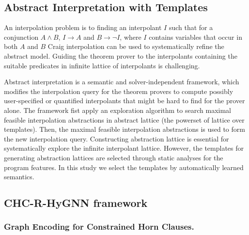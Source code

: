 \subsection{Abstract Interpretation with Templates}

An interpolation problem is to finding an interpolant $I$ such that for a conjunction $A\wedge B$, $I\rightarrow A$ and $B\rightarrow \neg I$, where $I$ contains variables that occur in both $A$ and $B$
%
Craig interpolation can be used to systematically
refine the abstract model.
%
Guiding the theorem prover to the interpolants containing the suitable predicates in infinite lattice of interpolants is challenging. 
 
 
Abstract interpretation \cite{Leroux2016} is a semantic and solver-independent framework, which modifies the interpolation query for the theorem provers to compute 
possibly user-specified or quantified interpolants that might be hard to find for the prover alone.
%
The framework fist apply an exploration algorithm to search maximal feasible interpolation abstractions in abstract lattice (the powerset of lattice over templates).
%
Then, the maximal feasible interpolation abstractions is used to form the new interpolation query. Constructing  abstraction lattice is essential for systematically explore the infinite interpolant lattice.
%
However, the templates for generating abstraction lattices are selected through static analyses for the program features.
%
In this study we select the templates by automatically learned semantics.


\subsection{CHC-R-HyGNN framework}

\subsubsection{Graph Encoding for Constrained Horn Clauses.}

